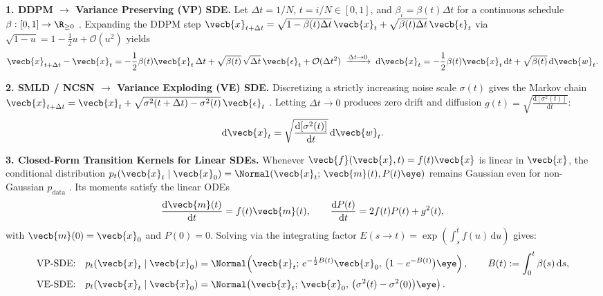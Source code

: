\documentclass[../../../../master.tex]{subfiles}
\begin{document}
\begin{coremath}
\textbf{1. DDPM $\to$ Variance Preserving (VP) SDE.} Let $\Delta t = 1/N$, $t = i/N \in [0, 1]$, and $\beta_i = \beta(t)\Delta t$ for a continuous schedule $\beta : [0, 1] \to \R_{\ge 0}$  . Expanding the DDPM step $\vecb{x}_{t+\Delta t} = \sqrt{1 - \beta(t)\Delta t}\,\vecb{x}_t + \sqrt{\beta(t)\Delta t}\,\vecb{\epsilon}_t$ via $\sqrt{1 - u} = 1 - \frac{1}{2}u + \mathcal{O}(u^2)$ yields
\begin{equation}\label{eq:sde:vp_euler}
  \vecb{x}_{t+\Delta t} - \vecb{x}_t = -\frac{1}{2}\beta(t)\vecb{x}_t\,\Delta t + \sqrt{\beta(t)}\,\sqrt{\Delta t}\,\vecb{\epsilon}_t + \mathcal{O}(\Delta t^2)
  \;\xrightarrow{\Delta t \to 0}\;
  \mathrm{d}\vecb{x}_t = -\frac{1}{2}\beta(t)\vecb{x}_t\,\mathrm{d}t + \sqrt{\beta(t)}\,\mathrm{d}\vecb{w}_t.
\end{equation}

\textbf{2. SMLD / NCSN $\to$ Variance Exploding (VE) SDE.} Discretizing a strictly increasing noise scale $\sigma(t)$ gives the Markov chain $\vecb{x}_{t+\Delta t} = \vecb{x}_t + \sqrt{\sigma^2(t+\Delta t) - \sigma^2(t)}\,\vecb{\epsilon}_t$  . Letting $\Delta t \to 0$ produces zero drift and diffusion $g(t) = \sqrt{\frac{\mathrm{d}[\sigma^2(t)]}{\mathrm{d}t}}$:
\begin{equation}\label{eq:sde:ve_sde}
  \mathrm{d}\vecb{x}_t = \sqrt{\frac{\mathrm{d}[\sigma^2(t)]}{\mathrm{d}t}}\,\mathrm{d}\vecb{w}_t.
\end{equation}

\textbf{3. Closed-Form Transition Kernels for Linear SDEs.} Whenever $\vecb{f}(\vecb{x}, t) = f(t)\vecb{x}$ is linear in $\vecb{x}$, the conditional distribution $p_t(\vecb{x}_t \mid \vecb{x}_0) = \Normal(\vecb{x}_t;\, \vecb{m}(t), P(t)\eye)$ remains Gaussian even for non-Gaussian $p_{\mathrm{data}}$ . Its moments satisfy the linear ODEs
\begin{equation}\label{eq:sde:moment_odes}
  \frac{\mathrm{d}\vecb{m}(t)}{\mathrm{d}t} = f(t)\vecb{m}(t), \qquad \frac{\mathrm{d}P(t)}{\mathrm{d}t} = 2f(t)P(t) + g^2(t),
\end{equation}
with $\vecb{m}(0) = \vecb{x}_0$ and $P(0) = 0$. Solving via the integrating factor $E(s \to t) = \exp\!\left(\int_s^t f(u)\,\mathrm{d}u\right)$ gives:
\begin{align}
  \text{VP-SDE:}\quad & p_t(\vecb{x}_t \mid \vecb{x}_0) = \Normal\!\left(\vecb{x}_t;\, e^{-\frac{1}{2}B(t)}\vecb{x}_0,\, \bigl(1 - e^{-B(t)}\bigr)\eye\right), \qquad B(t) := \int_0^t \beta(s)\,\mathrm{d}s, \label{eq:sde:vp_kernel} \\
  \text{VE-SDE:}\quad & p_t(\vecb{x}_t \mid \vecb{x}_0) = \Normal\!\left(\vecb{x}_t;\, \vecb{x}_0,\, \bigl(\sigma^2(t) - \sigma^2(0)\bigr)\eye\right). \label{eq:sde:ve_kernel}
\end{align}
\end{coremath}
\end{document}
